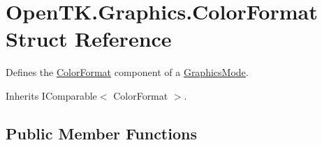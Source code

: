 \hypertarget{struct_open_t_k_1_1_graphics_1_1_color_format}{\section{Open\-T\-K.\-Graphics.\-Color\-Format Struct Reference}
\label{struct_open_t_k_1_1_graphics_1_1_color_format}
}


Defines the \hyperlink{struct_open_t_k_1_1_graphics_1_1_color_format}{Color\-Format} component of a \hyperlink{class_open_t_k_1_1_graphics_1_1_graphics_mode}{Graphics\-Mode}. 




Inherits I\-Comparable$<$ Color\-Format $>$.

\subsection*{Public Member Functions}
